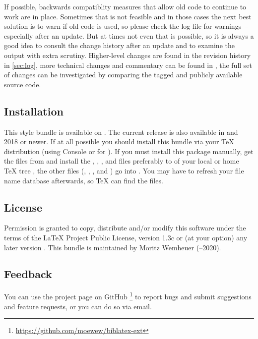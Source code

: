 \documentclass[DIV=9]{scrartcl}
\def\tex{TeX}%
\def\lppl{LaTeX Project Public License}%
\newcommand*{\ctan}{\mkbibacro{CTAN}}
\newcommand*{\gitbaseurl}{https://github.com/moewew/biblatex-ext}
\begin{document}
If possible, backwards compatiblity measures that allow old code to
continue to work are in place. Sometimes that is not feasible and in those
cases the next best solution is to warn if old code is used, so please check
the log file for warnings~-- especially after an update.
But at times not even that is possible, so it is always a good idea to consult
the change history after an update and to examine the output with extra
scrutiny.
Higher-level changes are found in the revision history in \cref{sec:log},
more technical changes and commentary can be found in ,
the full set of changes can be investigated by comparing the tagged and
publicly available source code.

\subsection{Installation}\label{sec:install}
This style bundle is available on \ctan.%
The current release is also available in \miktex{} and \texlive{} 2018 or
newer.
If at all possible you should install this bundle via your \tex{} distribution
(using \miktex{} Console or
 for \texlive
{}).
If you must install this package manually, get the files from \ctan{}
and install the , , ,
 and  files preferably to
 of your local or home \TeX{} tree%
, the other
files (, , ,
 and ) go into
. You may have to refresh your file name database
afterwards, so \tex{} can find the files.

\subsection{License}\label{sec:license}
Permission is granted to copy, distribute and\slash or modify this software
under the terms of the \lppl, version 1.3c%
or (at your option) any later version%
.
This bundle is maintained by Moritz Wemheuer (--2020).


\subsection{Feedback}\label{sec:feedback}
You can use the  project page on GitHub%
\footnote{\url{\gitbaseurl}} to report bugs and
submit suggestions and feature requests, or you can do so via email.
\end{document}
